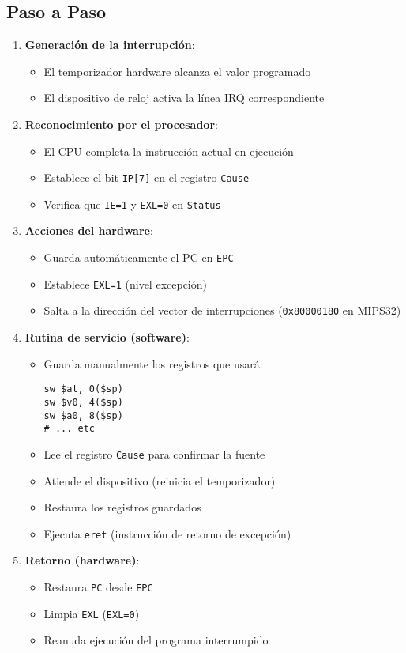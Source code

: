 \documentclass{article}
\begin{document}
\subsection{Paso a Paso}
\begin{enumerate}
    \item \textbf{Generación de la interrupción}:
    \begin{itemize}
        \item El temporizador hardware alcanza el valor programado
        \item El dispositivo de reloj activa la línea IRQ correspondiente
    \end{itemize}

    \item \textbf{Reconocimiento por el procesador}:
    \begin{itemize}
        \item El CPU completa la instrucción actual en ejecución
        \item Establece el bit \texttt{IP[7]} en el registro \texttt{Cause}
        \item Verifica que \texttt{IE=1} y \texttt{EXL=0} en \texttt{Status}
    \end{itemize}

    \item \textbf{Acciones del hardware}:
    \begin{itemize}
        \item Guarda automáticamente el PC en \texttt{EPC}
        \item Establece \texttt{EXL=1} (nivel excepción)
        \item Salta a la dirección del vector de interrupciones (\texttt{0x80000180} en MIPS32)
    \end{itemize}

    \item \textbf{Rutina de servicio (software)}:
    \begin{itemize}
        \item Guarda manualmente los registros que usará:
\begin{verbatim}
sw $at, 0($sp)
sw $v0, 4($sp)
sw $a0, 8($sp)
# ... etc
\end{verbatim}
        \item Lee el registro \texttt{Cause} para confirmar la fuente
        \item Atiende el dispositivo (reinicia el temporizador)
        \item Restaura los registros guardados
        \item Ejecuta \texttt{eret} (instrucción de retorno de excepción)
    \end{itemize}

    \item \textbf{Retorno (hardware)}:
    \begin{itemize}
        \item Restaura \texttt{PC} desde \texttt{EPC}
        \item Limpia \texttt{EXL} (\texttt{EXL=0})
        \item Reanuda ejecución del programa interrumpido
    \end{itemize}
\end{enumerate}
\end{document}
